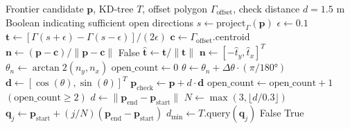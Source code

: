 \documentclass[11pt]{article}
\begin{document}
\begin{algorithm}[htbp]
	\caption{Outward Direction Validation}
	\label{alg:has_open_direction}
	\begin{algorithmic}[1]
		\Require Frontier candidate $\mathbf{p}$, KD-tree $T$, offset polygon $\Gamma_{\text{offset}}$, check distance $d = 1.5$ m
		\Ensure Boolean indicating sufficient open directions
		\State $s \gets \text{project}_\Gamma(\mathbf{p})$ 
		\State $\epsilon \gets 0.1$ 
		\State $\mathbf{t} \gets [\Gamma(s+\epsilon) - \Gamma(s-\epsilon)] / (2\epsilon)$ 
		\State $\mathbf{c} \gets \Gamma_{\text{offset}}.\text{centroid}$
		\State $\mathbf{n} \gets (\mathbf{p} - \mathbf{c}) / \|\mathbf{p} - \mathbf{c}\|$ 
		\State \Return False 
		\EndIf
		\Else
		\State $\hat{\mathbf{t}} \gets \mathbf{t} / \|\mathbf{t}\|$ 
		\State $\mathbf{n} \gets [-\hat{t}_y, \hat{t}_x]^T$ 
		\EndIf
		\State
		\State $\theta_n \gets \arctan2(n_y, n_x)$ 
		\State $\text{open\_count} \gets 0$
		\State
		\State $\theta \gets \theta_n + \Delta\theta \cdot (\pi/180°)$ 
		\State $\mathbf{d} \gets [\cos(\theta), \sin(\theta)]^T$ 
		\State $\mathbf{p}_{\text{check}} \gets \mathbf{p} + d \cdot \mathbf{d}$
		\State $\text{open\_count} \gets \text{open\_count} + 1$
		\EndIf
		\EndFor
		\State
		\State \Return $(\text{open\_count} \geq 2)$
		\EndFunction
		\State
		\State $d \gets \|\mathbf{p}_{\text{end}} - \mathbf{p}_{\text{start}}\|$
		\State $N \gets \max(3, \lfloor d / 0.3 \rfloor)$ 
		\State $\mathbf{q}_j \gets \mathbf{p}_{\text{start}} + (j/N)(\mathbf{p}_{\text{end}} - \mathbf{p}_{\text{start}})$
		\State $d_{\min} \gets T.\text{query}(\mathbf{q}_j)$ 
		\State \Return False 
		\EndIf
		\EndFor
		\State \Return True 
		\EndFunction
	\end{algorithmic}
\end{algorithm}
\end{document}
